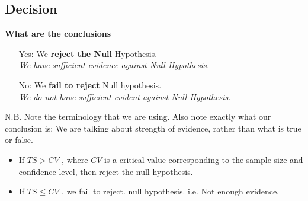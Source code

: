 \documentclass[a4paper,12pt]{article}
\begin{document}
\newpage 
\subsection*{Decision}



\begin{framed}
\noindent \textbf{What are the conclusions}
\begin{itemize} 

\item[Yes:] We \textbf{reject the Null} Hypothesis. \\ \textit{We have sufficient evidence against Null Hypothesis.}

\item[No:] We \textbf{fail to reject} Null hypothesis. \\ \textit{We do not have sufficient evident against Null Hypothesis.}
\end{itemize}
{\normalsize
N.B. Note the terminology that we are using. Also note exactly what our conclusion is: We are talking about strength of evidence, rather than what is true or false.}

\end{framed}
\begin{itemize}
\item If $TS > CV$ , where $CV$ is a critical value corresponding to the sample size and confidence level, then reject the null hypothesis. 
\item  If $TS \leq CV$ , we fail to reject. null hypothesis. i.e. Not enough evidence. 
\end{itemize}

\smallskip
\end{document}
